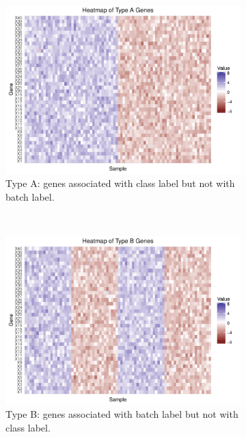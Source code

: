 \documentclass[11pt]{article}
\begin{document}
\begin{figure}[h!]
    \centering
    \begin{subfigure}[t]{0.4\textwidth}
    \includegraphics[width = \textwidth]{figures/Type_A_Gene.pdf}
    \caption{Type A: genes associated with class label but not with batch label.}
    \end{subfigure}
    ~
    \centering
    \begin{subfigure}[t]{0.4\textwidth}
    \includegraphics[width = \textwidth]{figures/Type_B_Gene.pdf}
    \caption{Type B: genes associated with batch label but not with class label.}
    \end{subfigure}
    \\
    \centering
    \begin{subfigure}[t]{0.4\textwidth}

\end{subfigure}
\end{figure}
\end{document}
